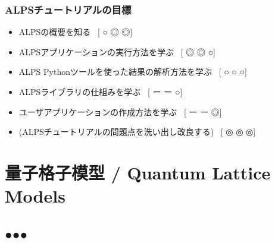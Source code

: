 \begin{frame}[t,fragile]
  \frametitle{ALPSチュートリアルの目標}
  \begin{itemize}
    \setlength{\itemsep}{1em}
    \item ALPSの概要を知る \ [{\footnotesize\color{red} ○}{\footnotesize\color{blue} ◎}{\footnotesize\color{green} ◎}]
    \item ALPSアプリケーションの実行方法を学ぶ  \ [{\footnotesize\color{red} ◎}{\footnotesize\color{blue} ◎}{\footnotesize\color{green} ○}]
    \item ALPS Pythonツールを使った結果の解析方法を学ぶ  \ [{\footnotesize\color{red} ○}{\footnotesize\color{blue} ○}{\footnotesize\color{green} ○}]
    \item ALPSライブラリの仕組みを学ぶ \ [{\footnotesize\color{red} ー}{\footnotesize\color{blue} ー}{\footnotesize\color{green} ○}]
    \item ユーザアプリケーションの作成方法を学ぶ \ [{\footnotesize\color{red} ー}{\footnotesize\color{blue} ー}{\footnotesize\color{green} ◎}]
    \item (ALPSチュートリアルの問題点を洗い出し改良する) \ [{\footnotesize\color{red} ◎}{\footnotesize\color{blue} ◎}{\footnotesize\color{green} ◎}] 
  \end{itemize}
\end{frame}

\section{量子格子模型 / Quantum Lattice Models}
\subsection*{{\protect\color{red}●}{\protect\color{blue}●}{\protect\color{green}●}}

